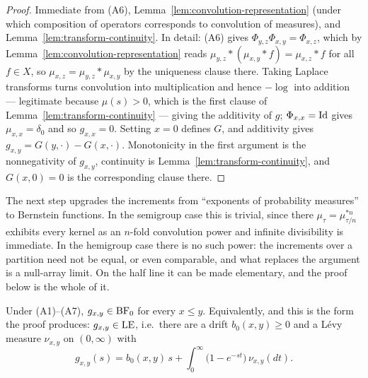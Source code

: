 \begin{proof}
Immediate from (A6), Lemma~\ref{lem:convolution-representation} (under which composition of
operators corresponds to convolution of measures), and Lemma~\ref{lem:transform-continuity}. In
detail: (A6) gives $\Phi_{y,z}\Phi_{x,y} = \Phi_{x,z}$, which by
Lemma~\ref{lem:convolution-representation} reads $\mu_{y,z} * (\mu_{x,y} * f) = \mu_{x,z} * f$
for all $f \in X$, so $\mu_{x,z} = \mu_{y,z} * \mu_{x,y}$ by the uniqueness clause there. Taking
Laplace transforms turns convolution into multiplication and hence $-\log$ into addition ---
legitimate because $\hat\mu(s) > 0$, which is the first clause of
Lemma~\ref{lem:transform-continuity} --- giving the additivity of $g$;
$\Phi_{x,x} = \mathrm{Id}$ gives $\mu_{x,x} = \delta_0$ and so
$g_{x,x} = 0$. Setting $x = 0$ defines $G$, and additivity gives
$g_{x,y} = G(y,\cdot) - G(x,\cdot)$. Monotonicity in the first argument is the nonnegativity
of $g_{x,y}$, continuity is Lemma~\ref{lem:transform-continuity}, and $G(x,0) = 0$ is the
corresponding clause there.
\end{proof}

The next step upgrades the increments from ``exponents of probability measures'' to Bernstein
functions. In the semigroup case this is trivial, since there $\mu_\tau = \mu_{\tau/n}^{*n}$
exhibits every kernel as an $n$-fold convolution power and infinite divisibility is immediate.
In the hemigroup case there is no such power: the increments over a partition need not be
equal, or even comparable, and what replaces the argument is a null-array limit. On the half
line it can be made elementary, and the proof below is the whole of it.

\begin{theorem}\label{thm:increments-bernstein}
Under (A1)--(A7), $g_{x,y} \in \mathrm{BF}_0$ for every $x \le y$. Equivalently, and this is the form the
proof produces: $g_{x,y} \in \mathrm{LE}$, i.e.\ there are a drift $b_0(x,y) \ge 0$ and a Lévy measure
$\nu_{x,y}$ on $(0,\infty)$ with
\[
  g_{x,y}(s) = b_0(x,y)\,s + \int_0^\infty \bigl(1 - e^{-st}\bigr)\,\nu_{x,y}(dt).
\]
\end{theorem}


